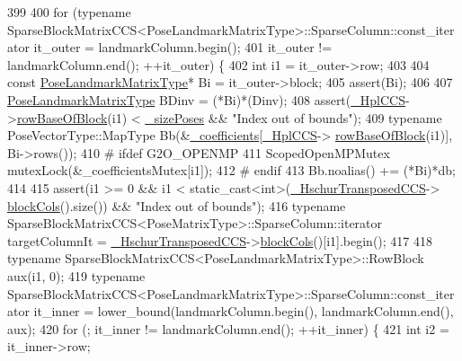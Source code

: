 \begin{DoxyCode}
399 
400     \textcolor{keywordflow}{for} (\textcolor{keyword}{typename} SparseBlockMatrixCCS<PoseLandmarkMatrixType>::SparseColumn::const\_iterator it\_outer = 
      landmarkColumn.begin();
401         it\_outer != landmarkColumn.end(); ++it\_outer) \{
402       \textcolor{keywordtype}{int} i1 = it\_outer->row;
403 
404       \textcolor{keyword}{const} \hyperlink{classg2o_1_1BlockSolver_a96bf60b923f816086cd2f24de38736ec}{PoseLandmarkMatrixType}* Bi = it\_outer->block;
405       assert(Bi);
406 
407       \hyperlink{classg2o_1_1BlockSolver_a96bf60b923f816086cd2f24de38736ec}{PoseLandmarkMatrixType} BDinv = (*Bi)*(Dinv);
408       assert(\hyperlink{classg2o_1_1BlockSolver_ab54eb7bb13f8b3a8a5f135a98f2050ec}{\_HplCCS}->\hyperlink{classg2o_1_1SparseBlockMatrixCCS_a8b35a98d3343554699811f682042a647}{rowBaseOfBlock}(i1) < \hyperlink{classg2o_1_1BlockSolver_a39ec000379885ce09cdd8c23ab6d4567}{\_sizePoses} && \textcolor{stringliteral}{"Index out of
       bounds"});
409       \textcolor{keyword}{typename} PoseVectorType::MapType Bb(&\hyperlink{classg2o_1_1BlockSolver_a416f480d4b27d7f8962ae7ae363f2e32}{\_coefficients}[\hyperlink{classg2o_1_1BlockSolver_ab54eb7bb13f8b3a8a5f135a98f2050ec}{\_HplCCS}->
      \hyperlink{classg2o_1_1SparseBlockMatrixCCS_a8b35a98d3343554699811f682042a647}{rowBaseOfBlock}(i1)], Bi->rows());
410 \textcolor{preprocessor}{#    ifdef G2O\_OPENMP}
411       ScopedOpenMPMutex mutexLock(&\_coefficientsMutex[i1]);
412 \textcolor{preprocessor}{#    endif}
413       Bb.noalias() += (*Bi)*db;
414 
415       assert(i1 >= 0 && i1 < static\_cast<int>(\hyperlink{classg2o_1_1BlockSolver_acea4b8ea8db5a29b63bea4bc568b0b26}{\_HschurTransposedCCS}->
      \hyperlink{classg2o_1_1SparseBlockMatrixCCS_ae43c6599984015bdc3d481266e1555ea}{blockCols}().size()) && \textcolor{stringliteral}{"Index out of bounds"});
416       \textcolor{keyword}{typename} SparseBlockMatrixCCS<PoseMatrixType>::SparseColumn::iterator targetColumnIt = 
      \hyperlink{classg2o_1_1BlockSolver_acea4b8ea8db5a29b63bea4bc568b0b26}{\_HschurTransposedCCS}->\hyperlink{classg2o_1_1SparseBlockMatrixCCS_ae43c6599984015bdc3d481266e1555ea}{blockCols}()[i1].begin();
417 
418       \textcolor{keyword}{typename} SparseBlockMatrixCCS<PoseLandmarkMatrixType>::RowBlock aux(i1, 0);
419       \textcolor{keyword}{typename} SparseBlockMatrixCCS<PoseLandmarkMatrixType>::SparseColumn::const\_iterator it\_inner = 
      lower\_bound(landmarkColumn.begin(), landmarkColumn.end(), aux);
420       \textcolor{keywordflow}{for} (; it\_inner != landmarkColumn.end(); ++it\_inner) \{
421         \textcolor{keywordtype}{int} i2 = it\_inner->row;

\end{DoxyCode}
